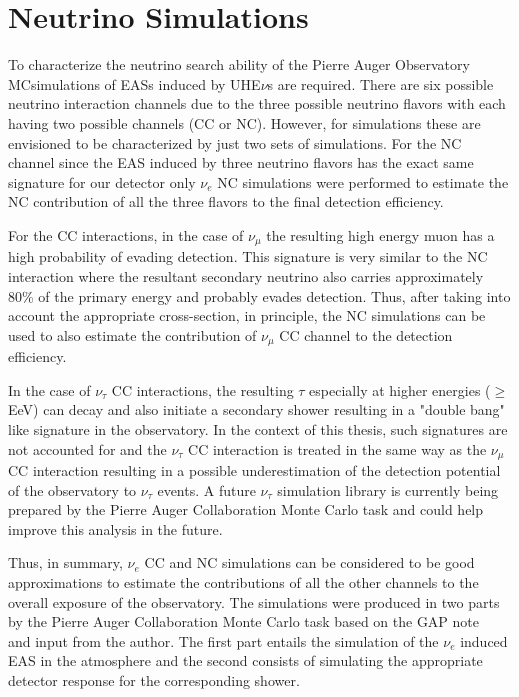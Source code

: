 \section{Neutrino Simulations}
\label{sec:sim_DGL}
To characterize the neutrino search ability of the Pierre Auger Observatory \gls{MC}simulations of EASs induced by UHE$\nu$s are required. There are six possible neutrino interaction channels due to the three possible neutrino flavors with each having two possible channels (CC or NC). However, for simulations these are envisioned to be characterized by just two sets of simulations. For the NC channel since the EAS induced by three neutrino flavors has the exact same signature for our detector only $\nu_e$ NC simulations were performed to estimate the NC contribution of all the three flavors to the final detection efficiency. 

For the CC interactions, in the case of $\nu_{\mu}$ the resulting high energy muon has a high probability of evading detection. This signature is very similar to the NC interaction where the resultant secondary neutrino also carries approximately 80\% of the primary energy and probably evades detection. Thus, after taking into account the appropriate cross-section, in principle, the NC simulations can be used to also estimate the contribution of $\nu_{\mu}$ CC channel to the detection efficiency.  

In the case of $\nu_{\tau}$ CC interactions, the resulting $\tau$ especially at higher energies ($\geq $EeV) can decay and also initiate a secondary shower resulting in a "double bang" like signature in the observatory. In the context of this thesis, such signatures are not accounted for and the $\nu_{\tau}$ CC interaction is treated in the same way as the $\nu_{\mu}$ CC interaction resulting in a possible underestimation of the detection potential of the observatory to $\nu_{\tau}$ events. A future $\nu_{\tau}$ simulation library is currently being prepared by the Pierre Auger Collaboration Monte Carlo task and could help improve this analysis in the future.

Thus, in summary, $\nu_e$ CC and NC simulations can be considered to be good approximations to estimate the contributions of all the other channels to the overall exposure of the observatory. The simulations were produced in two parts by the Pierre Auger Collaboration Monte Carlo task based on the GAP note~\cite{gap_note_2013} and input from the author. The first part entails the simulation of the $\nu_e$ induced EAS in the atmosphere and the second consists of simulating the appropriate detector response for the corresponding shower. 

